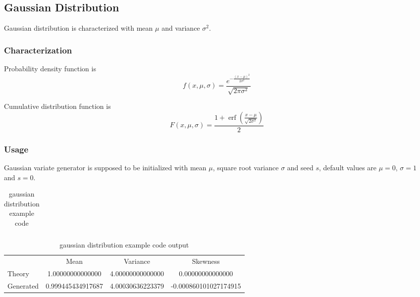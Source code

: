 \subsection{Gaussian Distribution} \label{gaussiandistribution}

Gaussian distribution is characterized with mean $\mu$ and variance $\sigma^2$.

\subsubsection{Characterization}

Probability density function is
\begin{equation}
f(x,\mu,\sigma) = \frac{e^{-\frac{(x-\mu)^2}{2\sigma^2}}}{\sqrt{2\pi \sigma^2}}
\end{equation}

Cumulative distribution function is
\begin{equation}
 F(x,\mu,\sigma) = \frac{1 + \operatorname{erf}\left( \frac{x-\mu}{\sqrt{2\sigma^2}}\right)}{2}
\end{equation}


\subsubsection{Usage}

Gaussian variate generator is supposed to be initialized with mean $\mu$, square root variance $\sigma$ and seed $s$, default values are
$\mu = 0$, $\sigma = 1$ and $s = 0$.

\begin{small}
\begin{ttfamily}
\begin{center}
\begin{longtable}{|l|}
\caption{gaussian distribution example code} \\
\hline 

\hline
\end{longtable}
\end{center}
\end{ttfamily}
\end{small}


\begin{center}
\begin{longtable}{|l | c c c|}
\caption{gaussian distribution example code output} \\
\hline 
           &       Mean                  & Variance            & Skewness \\
Theory     &      1.00000000000000       & 4.00000000000000    & 0.00000000000000  \\
Generated  &      0.999445434917687      & 4.00030636223379    & -0.000860101027174915 \\
\hline
\end{longtable}
\end{center}

